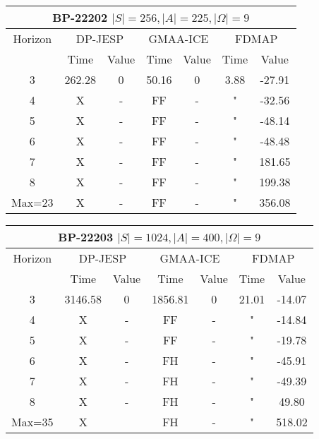 \documentclass[letterpaper]{article} %
\theoremstyle{definition}
\begin{document}
\begin{center}
    \begin{tabular}{||c|c|c|c|c|c|c||}
         \hline
         \multicolumn{7}{||c||}{BP-22202 $|S|=256, |A|=225, |\Omega|=9$} \\
         \hline
         Horizon & \multicolumn{2}{|c|}{DP-JESP} & \multicolumn{2}{|c|}{GMAA-ICE} & \multicolumn{2}{|c||}{FDMAP}\\ 
         \hline
         & Time & Value & Time & Value & Time & Value \\
         \hline
         3 & 262.28 & 0 & 50.16 & 0 & 3.88 & -27.91 \\
         \hline
         4 & X & - & FF & - & " & -32.56 \\
         \hline
         5 & X & - & FF & - & " & -48.14 \\ 
         \hline
         6 & X & - & FF & - & " & -48.48 \\
         \hline
         7 & X & - & FF & - & " & 181.65 \\
         \hline
         8 & X & - & FF & - & " & 199.38 \\
         \hline
         Max=23 & X & - & FF & - & " & 356.08 \\
         \hline
    \end{tabular}
\end{center}

\begin{center}
    \begin{tabular}{||c|c|c|c|c|c|c||}
         \hline
         \multicolumn{7}{||c||}{BP-22203 $|S|=1024, |A|=400, |\Omega|=9$} \\
         \hline
         Horizon & \multicolumn{2}{|c|}{DP-JESP} & \multicolumn{2}{|c|}{GMAA-ICE} & \multicolumn{2}{|c||}{FDMAP}\\ 
         \hline
         & Time & Value & Time & Value & Time & Value \\
         \hline
         3 & 3146.58 & 0 & 1856.81 & 0 & 21.01 & -14.07 \\
         \hline
         4 & X & - & FF & - & " & -14.84 \\
         \hline
         5 & X & - & FF & - & " & -19.78 \\ 
         \hline
         6 & X & - & FH & - & " & -45.91 \\
         \hline
         7 & X & - & FH & - & " & -49.39 \\
         \hline
         8 & X & - & FH & - & " & 49.80 \\
        \hline
         Max=35 & X &  & FH & - & " & 518.02 \\
         \hline
    \end{tabular}
\end{center}
\end{document}
